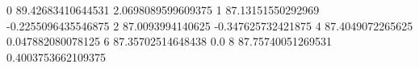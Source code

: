 0 89.42683410644531 2.0698089599609375
1 87.13151550292969 -0.2255096435546875
2 87.0093994140625 -0.347625732421875
4 87.4049072265625 0.047882080078125
6 87.35702514648438 0.0
8 87.75740051269531 0.4003753662109375
